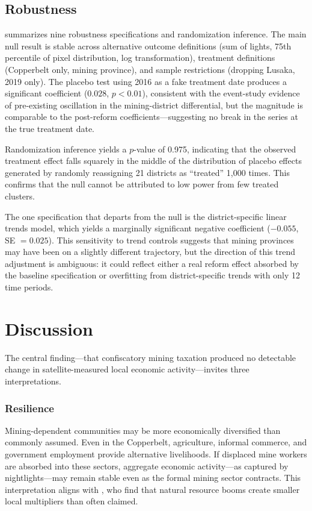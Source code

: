 \documentclass[12pt]{article}
\begin{document}


\subsection{Robustness}

 summarizes nine robustness specifications and randomization inference. The main null result is stable across alternative outcome definitions (sum of lights, 75th percentile of pixel distribution, log transformation), treatment definitions (Copperbelt only, mining province), and sample restrictions (dropping Lusaka, 2019 only). The placebo test using 2016 as a fake treatment date produces a significant coefficient ($0.028$, $p < 0.01$), consistent with the event-study evidence of pre-existing oscillation in the mining-district differential, but the magnitude is comparable to the post-reform coefficients---suggesting no break in the series at the true treatment date.

Randomization inference yields a $p$-value of 0.975, indicating that the observed treatment effect falls squarely in the middle of the distribution of placebo effects generated by randomly reassigning 21 districts as ``treated'' 1,000 times. This confirms that the null cannot be attributed to low power from few treated clusters.

The one specification that departs from the null is the district-specific linear trends model, which yields a marginally significant negative coefficient ($-0.055$, SE $= 0.025$). This sensitivity to trend controls suggests that mining provinces may have been on a slightly different trajectory, but the direction of this trend adjustment is ambiguous: it could reflect either a real reform effect absorbed by the baseline specification or overfitting from district-specific trends with only 12 time periods.



\section{Discussion}
\label{sec:discussion}

The central finding---that confiscatory mining taxation produced no detectable change in satellite-measured local economic activity---invites three interpretations.

\subsubsection*{Resilience} Mining-dependent communities may be more economically diversified than commonly assumed. Even in the Copperbelt, agriculture, informal commerce, and government employment provide alternative livelihoods. If displaced mine workers are absorbed into these sectors, aggregate economic activity---as captured by nightlights---may remain stable even as the formal mining sector contracts. This interpretation aligns with \citet{allcott2018dutch}, who find that natural resource booms create smaller local multipliers than often claimed.
\end{document}
